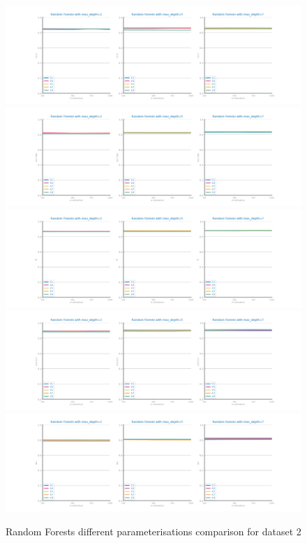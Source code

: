 \documentclass[10pt]{extarticle}
\begin{document}
\begin{figure}[H]
\centering\includegraphics[scale=0.6]{images/dataset2/models_evaluation/Credit_Score_rf_recall_study.png}
\includegraphics[scale=0.6]{images/dataset2/models_evaluation/Credit_Score_rf_accuracy_study.png}
\includegraphics[scale=0.6]{images/dataset2/models_evaluation/Credit_Score_rf_f1_study.png}
\includegraphics[scale=0.6]{images/dataset2/models_evaluation/Credit_Score_rf_precision_study.png}
\includegraphics[scale=0.6]{images/dataset2/models_evaluation/Credit_Score_rf_auc_study.png}
\caption{Random Forests different parameterisations comparison for dataset 2}
\end{figure}
\end{document}
